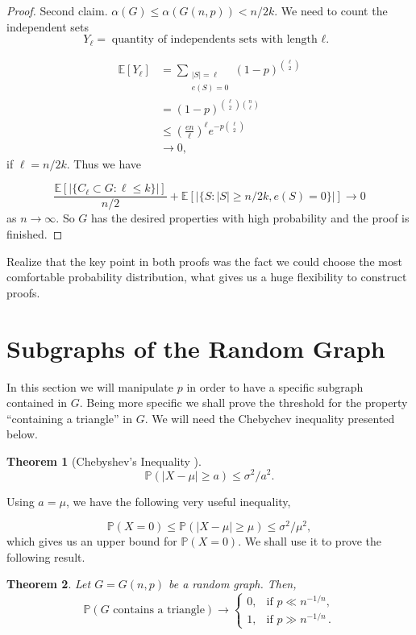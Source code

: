 \documentclass[12pt,twoside,a4paper,bibliography=totocnumbered]{book}
\numberwithin{equation}{section}
\newtheorem{theorem}             {Theorem}[section]
\theoremstyle{remark}
\begin{document}
\begin{proof}
Second claim. $\alpha(G) \leq \alpha (G(n,p)) < n/2k$. We need to count the independent sets
$$Y_{\ell} = \text{quantity of independents sets with length ${\ell}$. }$$

\begin{align*}
\mathbb{E}[Y_{\ell}] &= \sum_{\substack{|S| = {\ell} \\ e(S) = 0 }} (1-p)^{\binom{{\ell}}{2}}\\
	       &= (1-p)^{\binom{{\ell}}{2} \binom{n}{{\ell}}} \\
	       &\leq \left(\frac{en}{{\ell}}\right)^{\ell} e^{-p\binom{{\ell}}{2}}\\
	       &\rightarrow 0,
\end{align*}
if $\ell = n/2k$. Thus we have

$$\frac{\mathbb{E}[|\{C_{\ell} \subset G : {\ell}\leq k \}|]}{n/2} + \mathbb{E} [|\{ S:|S| \geq n/2k, e(S) = 0\}|] \rightarrow 0$$
as $n \rightarrow \infty $. So $G$ has the desired properties with high probability and the proof is finished.
\end{proof}

Realize that the key point in both proofs was the fact we could choose the most comfortable probability distribution, what gives us a huge flexibility to construct proofs.

\section{Subgraphs of the Random Graph}

In this section we will manipulate $p$ in order to have a specific subgraph contained in $G$. Being more specific we shall prove the threshold for the property ``containing a triangle'' in $G$.  We will need the Chebychev inequality presented below.

\begin{theorem}[{Chebyshev's Inequality \cite{Ch67}}]
$$\mathbb{P}(|X-\mu| \geq a) \leq \sigma^2/a^2.$$
\end{theorem} 

Using $a = \mu$, we have the following very useful inequality,

$$\mathbb{P}(X=0) \leq \mathbb{P}(|X-\mu | \geq \mu) \leq \sigma^2/\mu^2,$$
which gives us an upper bound for $\mathbb{P}(X=0)$. We shall use it to prove the following result.\\

\begin{theorem}
Let $G=G(n,p)$ be a random graph.
Then,
$$
\mathbb{P}(G\text{ contains a triangle}) \rightarrow 
\begin{cases}
		0, &\text{if $p\ll n^{-1/n}$},\\
		1, &\text{if $p\gg n^{-1/n}$}\,.
\end{cases}
$$
\end{theorem}
\end{document}
